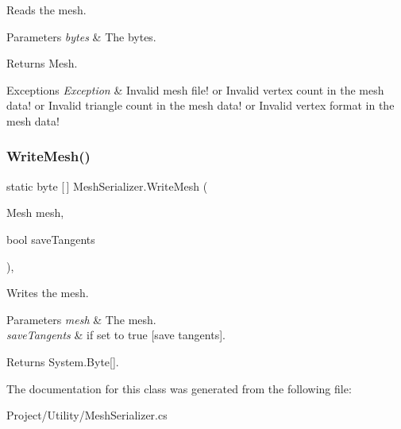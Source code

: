 Reads the mesh. 


\begin{DoxyParams}{Parameters}
{\em bytes} & The bytes.\\
\hline
\end{DoxyParams}
\begin{DoxyReturn}{Returns}
Mesh.
\end{DoxyReturn}

\begin{DoxyExceptions}{Exceptions}
{\em Exception} & Invalid mesh file! or Invalid vertex count in the mesh data! or Invalid triangle count in the mesh data! or Invalid vertex format in the mesh data! \\
\hline
\end{DoxyExceptions}
\mbox{\label{class_mesh_serializer_a7e90d8200b8ac6c34a867a0e5eb47363}} 
\subsubsection{\texorpdfstring{Write\+Mesh()}{WriteMesh()}}
{\footnotesize\ttfamily static byte \mbox{[}$\,$\mbox{]} Mesh\+Serializer.\+Write\+Mesh (\begin{DoxyParamCaption}\item[{Mesh}]{mesh,  }\item[{bool}]{save\+Tangents }\end{DoxyParamCaption})\hspace{0.3cm}{\ttfamily [inline]}, {\ttfamily [static]}}



Writes the mesh. 


\begin{DoxyParams}{Parameters}
{\em mesh} & The mesh.\\
\hline
{\em save\+Tangents} & if set to {\ttfamily true} \mbox{[}save tangents\mbox{]}.\\
\hline
\end{DoxyParams}
\begin{DoxyReturn}{Returns}
System.\+Byte\mbox{[}\mbox{]}.
\end{DoxyReturn}


The documentation for this class was generated from the following file\+:\begin{DoxyCompactItemize}
\item 
Project/\+Utility/Mesh\+Serializer.\+cs\end{DoxyCompactItemize}
